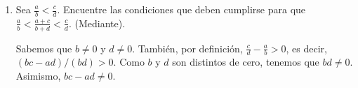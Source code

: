 \documentclass[11pt]{article}
\begin{document}
\begin{enumerate}[label=\alph*)]

 \item Sea $\frac{a}{b}<\frac{c}{d}$. Encuentre las condiciones que deben cumplirse para que $\frac{a}{b}<\frac{a+c}{b+d}<\frac{c}{d}$. (Mediante).

 Sabemos que $b\neq 0$ y $d\neq 0$. También, por definición, $\frac{c}{d}-\frac{a}{b}>0$, es decir, $(bc-ad)/(bd)>0$. Como $b$ y $d$ son distintos de cero, tenemos que $bd\neq 0$. Asimismo, $bc-ad\neq 0$.


\end{enumerate}
\end{document}
